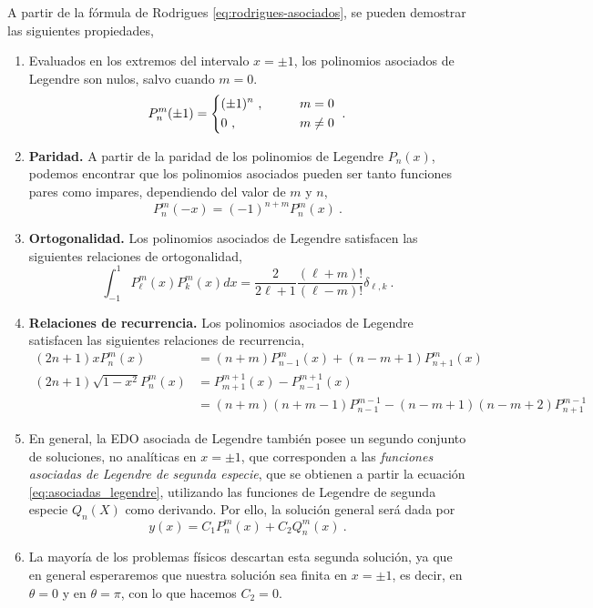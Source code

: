 A partir de la fórmula de Rodrigues \eqref{eq:rodrigues-asociados}, se pueden demostrar las siguientes propiedades,
\begin{enumerate}[resume=asociadas]
    \item Evaluados en los extremos del intervalo $x= \pm 1$, los polinomios asociados de Legendre son nulos, salvo cuando $m=0$.
    \begin{equation}
        P_n^m(\pm 1) = \begin{dcases}
            (\pm 1)^n \ , & \qquad m = 0 \\
            0 \ , & \qquad m \neq 0
        \end{dcases} \ .
    \end{equation}

    \item \textbf{Paridad.} A partir de la paridad de los polinomios de Legendre $P_n(x)$, podemos encontrar que los polinomios asociados pueden ser tanto funciones pares como impares, dependiendo del valor de $m$ y $n$,
    \begin{equation}
        P_n^m(-x) = (-1)^{n+m} P_n^m(x) \ .
    \end{equation}

    \item \textbf{Ortogonalidad.} Los polinomios asociados de Legendre satisfacen las siguientes relaciones de ortogonalidad,
    \begin{equation}
        \int_{-1}^1 P_\ell^m(x) P_k^m(x) dx = \frac{2}{2\ell + 1} \frac{(\ell + m)!}{(\ell - m)!} \delta_{\ell, k} \ .
    \end{equation}

    \item \textbf{Relaciones de recurrencia.} Los polinomios asociados de Legendre satisfacen las siguientes relaciones de recurrencia,
    \begin{align}
        (2n+1)x P_n^m(x) & = (n+m) P^m_{n-1}(x) + (n-m+1) P^m_{n+1}(x) \\
        (2n+1) \sqrt{1-x^2} P_n^m(x) & = P^{m+1}_{m+1}(x) - P^{m+1}_{n-1}(x) \\
        & = (n+m)(n+m-1)P^{m-1}_{n-1} - (n-m+1)(n-m+2)P^{m-1}_{n+1} 
    \end{align}

    \item En general, la EDO asociada de Legendre también posee un segundo conjunto de soluciones, no analíticas en $x = \pm 1$, que corresponden a las \emph{funciones asociadas de Legendre de segunda especie}, que se obtienen a partir la ecuación \eqref{eq:asociadas_legendre}, utilizando las funciones de Legendre de segunda especie $Q_n(X)$ como derivando. Por ello, la solución general será dada por
    \begin{equation}
        y(x) = C_1 P_n^m(x) + C_2 Q_n^m(x) \ .
    \end{equation}

    \item La mayoría de los problemas físicos descartan esta segunda solución, ya que en general esperaremos que nuestra solución sea finita en $x = \pm 1$, es decir, en $\theta = 0$ y en $\theta = \pi$, con lo que hacemos $C_2 = 0$.
\end{enumerate}



